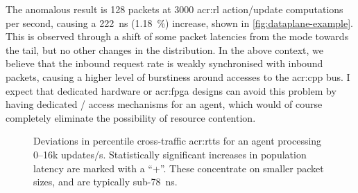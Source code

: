 The anomalous result is \qty{128}{\byte} packets at \num{3000} \gls{acr:rl} action/update computations per second, causing a \qty{222}{\nano\second} (\qty{1.18}{\percent}) increase, shown in \cref{fig:dataplane-example}.
This is observed through a shift of some packet latencies from the mode towards the tail, but no other changes in the distribution.
In the above context, we believe that the inbound request rate is weakly synchronised with inbound packets, causing a higher level of burstiness around accesses to the \gls{acr:cpp} bus.
I expect that dedicated hardware or \gls{acr:fpga} designs can avoid this problem by having dedicated \inring{}/\outring{} access mechanisms for an \approachshort{} agent, which would of course completely eliminate the possibility of resource contention.

\begin{figure}
	\centering
		\caption[Deviations in  percentile cross-traffic RTTs for an \approachshort{} agent processing \numrange{0}{16}k updates/s.]{Deviations in  percentile cross-traffic \glspl{acr:rtt} for an \approachshort{} agent processing \numrange{0}{16}k updates/s. Statistically significant increases in population latency are marked with a ``+''. These concentrate on smaller packet sizes, and are typically sub-\qty{78}{\nano\second}.\label{fig:dataplane-heat}}
\end{figure}

